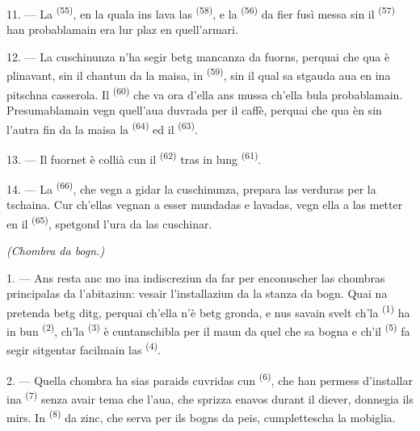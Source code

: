 \VUsaut{4.0mm}
\VUsaut{3.0mm}

11. --- La  \textsuperscript{(55)}, en la quala ins lava las
 \textsuperscript{(58)}, e la  \textsuperscript{(56)}
da fier fusì messa sin il  \textsuperscript{(57)} han
probablamain era lur plaz en quell'armari.

12. --- La cuschinunza n'ha segir betg mancanza da fuorns, perquai che qua è
plinavant, sin il chantun da la maisa, in 
\textsuperscript{(59)}, sin il qual sa stgauda aua en ina pitschna casserola. Il
 \textsuperscript{(60)} che va ora d'ella ans mussa ch'ella bula
probablamain. Presumablamain vegn quell'aua duvrada per il caffè, perquai che qua èn
sin l'autra fin da la maisa la  \textsuperscript{(64)} ed il
 \textsuperscript{(63)}.

13. --- Il fuornet è collià cun il  \textsuperscript{(62)}
tras in lung  \textsuperscript{(61)}.

14. --- La  \textsuperscript{(66)}, che vegn a gidar la
cuschinunza, prepara las verduras per la tschaina. Cur ch'ellas vegnan a esser
mundadas e lavadas, vegn ella a las metter en il 
\textsuperscript{(65)}, spetgond l'ura da las cuschinar.

\VUsaut{4.0mm}
{\centering\fontsize{10.2pt}{10.2pt}\selectfont{} \textit{(Chombra da bogn.)}\par}
\VUsaut{3.0mm}

1. --- Ans resta anc mo ina indiscreziun da far per enconuscher las chombras
principalas da l'abitaziun: vesair l'installaziun da la stanza da bogn. Quai na
pretenda betg ditg, perquai ch'ella n'è betg gronda, e nus savain svelt ch'la
 \textsuperscript{(1)} ha in bun 
\textsuperscript{(2)}, ch'la  \textsuperscript{(3)} è
cuntanschibla per il maun da quel che sa bogna e ch'il 
\textsuperscript{(5)} fa segir sitgentar facilmain las 
\textsuperscript{(4)}.

2. --- Quella chombra ha sias paraids cuvridas cun 
\textsuperscript{(6)}, che han permess d'installar ina 
\textsuperscript{(7)} senza avair tema che l'aua, che sprizza enavos durant il
diever, donnegia ils mirs. In  \textsuperscript{(8)} da zinc, che
serva per ils bogns da peis, cumplettescha la mobiglia.

\VUsaut{6.0mm}
\VUfilet{22mm}
